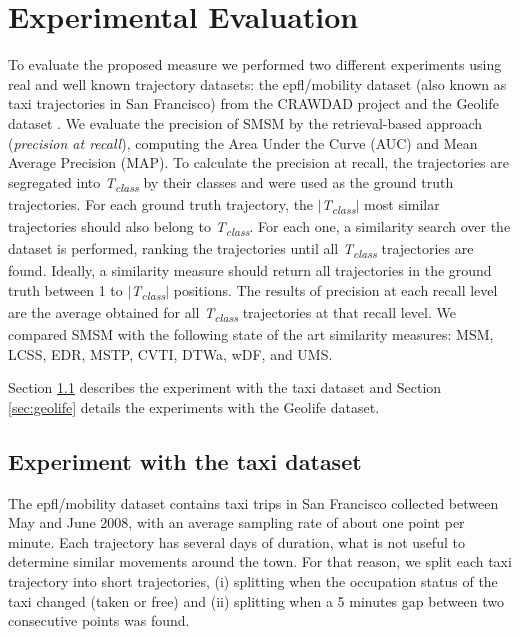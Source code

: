 \documentclass[12pt]{article}
\begin{document}
\section{Experimental Evaluation} \label{sec:experiments}
To evaluate the proposed measure we performed two different experiments using real and well known trajectory datasets: {the epfl/mobility dataset (also known as taxi trajectories in San Francisco) from the CRAWDAD project} \citep{epfl-mobility-20090224} and the Geolife dataset \citep{zheng2009mining}. We evaluate the precision of SMSM by the retrieval-based approach (\textit{precision at recall}), computing the Area Under the Curve (AUC) and Mean Average Precision (MAP). To calculate the precision at recall, the trajectories are segregated into \textit{T\textsubscript{class}} by their classes and were used as the ground truth trajectories. For each ground truth trajectory, the $|$\textit{T\textsubscript{class}}$|$ most similar trajectories should also belong to \textit{T\textsubscript{class}}. For each one, a similarity search over the dataset is performed, ranking the trajectories until all \textit{T\textsubscript{class}} trajectories are found. Ideally, a similarity measure should return all trajectories in the ground truth between 1 to $|$\textit{T\textsubscript{class}}$|$ positions. The results of precision at each recall level are the average obtained for all \textit{T\textsubscript{class}} trajectories at that recall level. {We compared SMSM with the following state of the art similarity measures: MSM, LCSS, EDR, MSTP, CVTI, DTWa, wDF, and UMS.}

Section \ref{sec:crawdad} describes the experiment with the {taxi} dataset and Section \ref{sec:geolife} details the experiments with the Geolife dataset.

\subsection{Experiment with the {taxi} dataset}\label{sec:crawdad}

The {epfl/mobility} dataset contains taxi trips in San Francisco collected between May and June 2008, with an average sampling rate of about one point per minute. Each trajectory has several days of duration, what is not useful to determine similar movements around the town. For that reason, we split each taxi trajectory into short trajectories, (i) splitting when the occupation status of the taxi changed (taken or free) and (ii) splitting when a 5 minutes gap between two consecutive points was found.
\end{document}
